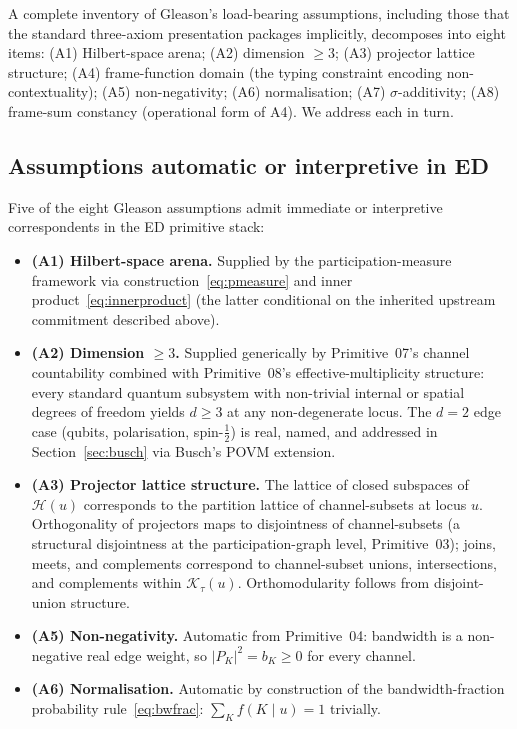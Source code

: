 \documentclass[11pt,a4paper]{article}
\begin{document}
A complete inventory of Gleason's load-bearing assumptions, including those that the standard three-axiom presentation packages implicitly, decomposes into eight items: (A1) Hilbert-space arena; (A2) dimension $\geq 3$; (A3) projector lattice structure; (A4) frame-function domain (the typing constraint encoding non-contextuality); (A5) non-negativity; (A6) normalisation; (A7) $\sigma$-additivity; (A8) frame-sum constancy (operational form of A4). We address each in turn.

\subsection{Assumptions automatic or interpretive in ED}

Five of the eight Gleason assumptions admit immediate or interpretive correspondents in the ED primitive stack:

\begin{itemize}
  \item \textbf{(A1) Hilbert-space arena.} Supplied by the participation-measure framework via construction~\eqref{eq:pmeasure} and inner product~\eqref{eq:innerproduct} (the latter conditional on the inherited upstream commitment described above).
  \item \textbf{(A2) Dimension $\geq 3$.} Supplied generically by Primitive~07's channel countability combined with Primitive~08's effective-multiplicity structure: every standard quantum subsystem with non-trivial internal or spatial degrees of freedom yields $d \geq 3$ at any non-degenerate locus. The $d = 2$ edge case (qubits, polarisation, spin-$\tfrac{1}{2}$) is real, named, and addressed in Section~\ref{sec:busch} via Busch's POVM extension.
  \item \textbf{(A3) Projector lattice structure.} The lattice of closed subspaces of $\mathcal{H}(u)$ corresponds to the partition lattice of channel-subsets at locus $u$. Orthogonality of projectors maps to disjointness of channel-subsets (a structural disjointness at the participation-graph level, Primitive~03); joins, meets, and complements correspond to channel-subset unions, intersections, and complements within $\mathcal{K}_\tau(u)$. Orthomodularity follows from disjoint-union structure.
  \item \textbf{(A5) Non-negativity.} Automatic from Primitive~04: bandwidth is a non-negative real edge weight, so $|P_K|^2 = b_K \geq 0$ for every channel.
  \item \textbf{(A6) Normalisation.} Automatic by construction of the bandwidth-fraction probability rule~\eqref{eq:bwfrac}: $\sum_K f(K \mid u) = 1$ trivially.
\end{itemize}
\end{document}
